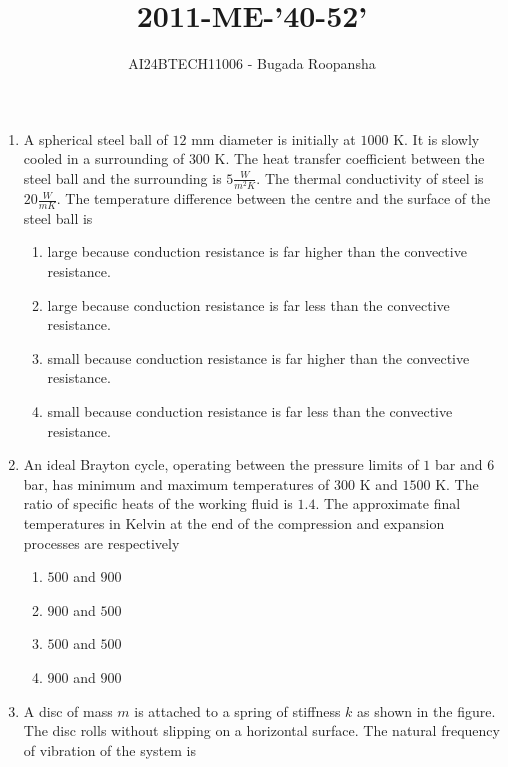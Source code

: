 \documentclass[journal,12pt,twocolumn]{IEEEtran}
\theoremstyle{remark}
\begin{document}

\vspace{3cm}
\title{2011-ME-'40-52'}
\author{AI24BTECH11006 - Bugada Roopansha}
\maketitle

\begin{enumerate}[start=40]
 

    \item A spherical steel ball of $12$ mm diameter is initially at $1000$ K. It is slowly cooled in a surrounding of $300$ K. The heat transfer coefficient between the steel ball and the surrounding is $5 \frac{W}{m^2 K}$. The thermal conductivity of steel is $20 \frac{W}{mK}$. The temperature difference between the centre and the surface of the steel ball is
    \begin{enumerate}
        \item large because conduction resistance is far higher than the convective resistance.
        \item large because conduction resistance is far less than the convective resistance.
        \item small because conduction resistance is far higher than the convective resistance.
        \item small because conduction resistance is far less than the convective resistance.
    \end{enumerate}

    \item An ideal Brayton cycle, operating between the pressure limits of $1$ bar and $6$ bar, has minimum and maximum temperatures of $300$ K and $1500$ K. The ratio of specific heats of the working fluid is $1.4$. The approximate final temperatures in Kelvin at the end of the compression and expansion processes are respectively
    \begin{enumerate}
        \item $500$ and $900$
        \item $900$ and $500$
        \item $500$ and $500$
        \item $900$ and $900$
    \end{enumerate}

    \item A disc of mass $m$ is attached to a spring of stiffness $k$ as shown in the figure. The disc rolls without slipping on a horizontal surface. The natural frequency of vibration of the system is


\end{enumerate}
\end{document}
